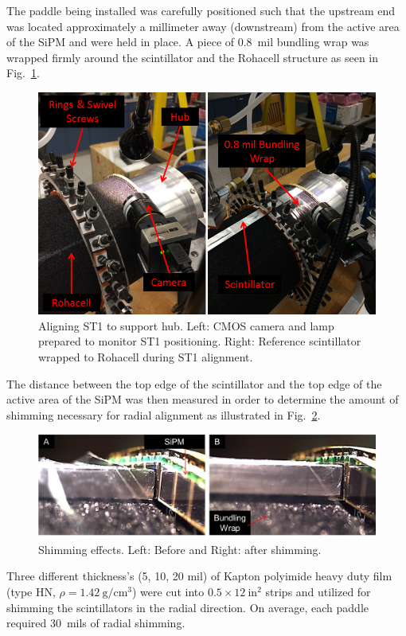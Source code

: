 The paddle being installed was carefully positioned such that the upstream end was located approximately a millimeter away (downstream) from the active area of the SiPM and were held in place. A piece of 0.8~mil bundling wrap was wrapped firmly around the scintillator and the Rohacell structure as seen in Fig.~\ref{fig:aligning_st1_to_hub}. 
	\begin{figure}[!htb]
		\centering
		\includegraphics[width=1.0\columnwidth]{fabrication/figs/aligning_st1_to_hub}
		\caption{Aligning ST1 to support hub.  Left: CMOS camera and lamp prepared to monitor ST1 positioning.  Right: Reference scintillator wrapped to Rohacell during ST1 alignment.}
		\label{fig:aligning_st1_to_hub}
	\end{figure}
The distance between the top edge of the scintillator and the top edge of the active area of the SiPM was then measured in order to determine the amount of shimming necessary for radial alignment as illustrated in Fig.~\ref{fig:shimming_effects}. 
	\begin{figure}[!htb]
		\centering
		\includegraphics[width=1.0\columnwidth]{fabrication/figs/st_va}
		\caption[Shimming effects]{Shimming effects.  Left: Before and Right: after shimming.}
		\label{fig:shimming_effects}
	\end{figure}
Three different thickness's (5, 10, 20 mil) of Kapton polyimide heavy duty film (type HN, $\rho = 1.42\ \mathrm{g/cm^{3}}$) were cut into $\mathrm{0.5 \times 12\ in^{2}}$ strips and utilized for shimming the scintillators in the radial direction.  On average, each paddle required 30~mils of radial shimming.

